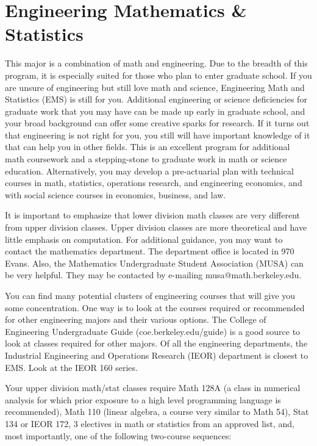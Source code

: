 \chapter*{Engineering Mathematics \& Statistics}

This major is a combination of math and engineering. Due to the breadth of this program, it is especially suited for those who plan to enter graduate school. If you are unsure of engineering but still love math and science, Engineering Math and Statistics (EMS) is still for you. Additional engineering or science deficiencies for graduate work that you may have can be made up early in graduate school, and your broad background can offer some creative sparks for research. If it turns out that engineering is not right for you, you still will have important knowledge of it that can help you in other fields. This is an excellent program for additional math coursework and a stepping-stone to graduate work in math or science education. Alternatively, you may develop a pre-actuarial plan with technical courses in math, statistics, operations research, and engineering economics, and with social science courses in economics, business, and law.

It is important to emphasize that lower division math classes are very different from upper division classes. Upper division classes are more theoretical and have little emphasis on computation. For additional guidance, you may want to contact the mathematics department. The department office is located in 970 Evans. Also, the Mathematics Undergraduate Student Association (MUSA) can be very helpful. They may be contacted by e-mailing musa@math.berkeley.edu.

You can find many potential clusters of engineering courses that will give you some concentration. One way is to look at the courses required or recommended for other engineering majors and their various options. The College of Engineering Undergraduate Guide ({\selectfont coe.berkeley.edu/guide}) is a good source to look at classes required for other majors. Of all the engineering departments, the Industrial Engineering and Operations Research (IEOR) department is closest to EMS. Look at the IEOR 160 series.

Your upper division math/stat classes require Math 128A (a class in numerical analysis for which prior exposure to a high level programming language is recommended), Math 110 (linear algebra, a course very 
similar to Math 54), Stat 134 or IEOR 172, 3 electives in math or 
statistics from an approved list, and, most importantly, one of the following two-course sequences:

